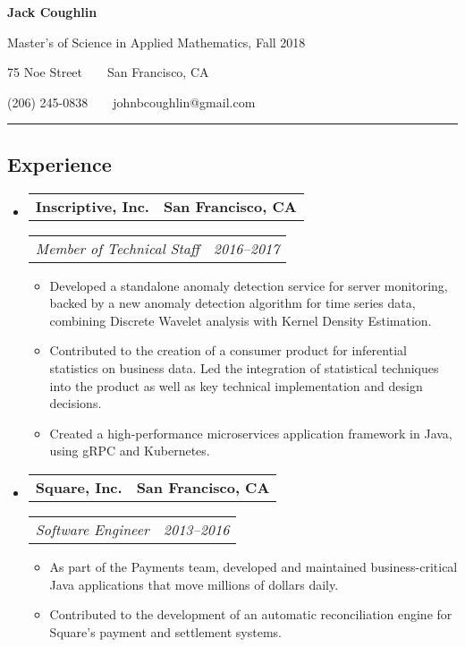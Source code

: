 \documentclass[letterpaper,10pt]{article}
\makeatletter
\newcommand{\headerrow}[2]
{\begin{tabular*}{\linewidth}{l@{\extracolsep{\fill}}r}
	#1 &
	#2 \\
\end{tabular*}}
\makeatother
\begin{document}

\begin{center}
  {\LARGE \textbf{Jack Coughlin}} \

  Master's of Science in Applied Mathematics, Fall 2018
  \vspace{3mm}

  75 Noe Street\ \ \textbullet\ \
  San Francisco, CA

  (206) 245-0838\ \ \textbullet\ \
  johnbcoughlin@gmail.com
\end{center}

\hrule
\vspace{-0.4em}
\subsection*{Experience}
\begin{itemize}
  \item
    \headerrow
      {\textbf{Inscriptive, Inc.}}
      {\textbf{San Francisco, CA}}
    \headerrow
      {\emph{Member of Technical Staff}}
      {\emph{2016--2017}}
    \begin{itemize}
      \item
        Developed a standalone anomaly detection service for server monitoring, backed by a new anomaly detection algorithm for time series data, combining Discrete Wavelet analysis with Kernel Density Estimation.
      \item
        Contributed to the creation of a consumer product for inferential statistics on business data.
        Led the integration of statistical techniques into the product as well as key technical implementation and design decisions.
      \item
        Created a high-performance microservices application framework in Java, using gRPC and Kubernetes.
    \end{itemize}
  \item
    \headerrow
      {\textbf{Square, Inc.}}
      {\textbf{San Francisco, CA}}
    \headerrow
      {\emph{Software Engineer}}
      {\emph{2013--2016}}
    \begin{itemize}
      \item
        As part of the Payments team, developed and maintained business-critical Java applications that move millions of dollars daily.
      \item
        Contributed to the development of an automatic reconciliation engine for Square's payment and settlement systems.
    \end{itemize}
\end{itemize}
\end{document}
